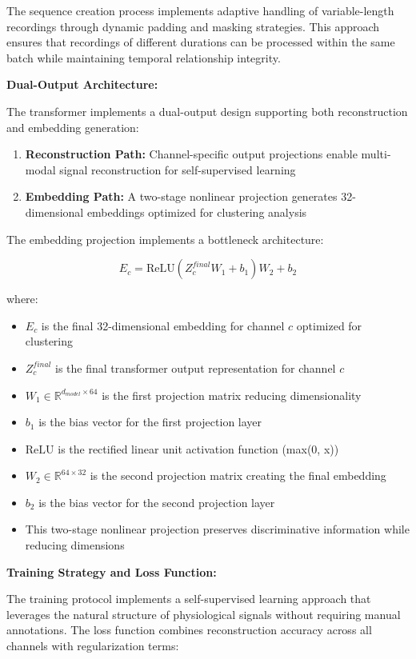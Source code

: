 \documentclass[a4paper,12pt,twoside]{article}
\begin{document}
The sequence creation process implements adaptive handling of variable-length recordings through dynamic padding and masking strategies. This approach ensures that recordings of different durations can be processed within the same batch while maintaining temporal relationship integrity.

\textbf{Dual-Output Architecture:}

The transformer implements a dual-output design supporting both reconstruction and embedding generation:

\begin{enumerate}
    \item \textbf{Reconstruction Path:} Channel-specific output projections enable multi-modal signal reconstruction for self-supervised learning
    \item \textbf{Embedding Path:} A two-stage nonlinear projection generates 32-dimensional embeddings optimized for clustering analysis
\end{enumerate}

The embedding projection implements a bottleneck architecture:

$$E_c = \text{ReLU}(Z_c^{final} W_1 + b_1) W_2 + b_2$$

where:
\begin{itemize}
    \item $E_c$ is the final 32-dimensional embedding for channel $c$ optimized for clustering
    \item $Z_c^{final}$ is the final transformer output representation for channel $c$
    \item $W_1 \in \mathbb{R}^{d_{model} \times 64}$ is the first projection matrix reducing dimensionality
    \item $b_1$ is the bias vector for the first projection layer
    \item $\text{ReLU}$ is the rectified linear unit activation function (max(0, x))
    \item $W_2 \in \mathbb{R}^{64 \times 32}$ is the second projection matrix creating the final embedding
    \item $b_2$ is the bias vector for the second projection layer
    \item This two-stage nonlinear projection preserves discriminative information while reducing dimensions
\end{itemize}

\textbf{Training Strategy and Loss Function:}

The training protocol implements a self-supervised learning approach that leverages the natural structure of physiological signals without requiring manual annotations. The loss function combines reconstruction accuracy across all channels with regularization terms:
\end{document}
